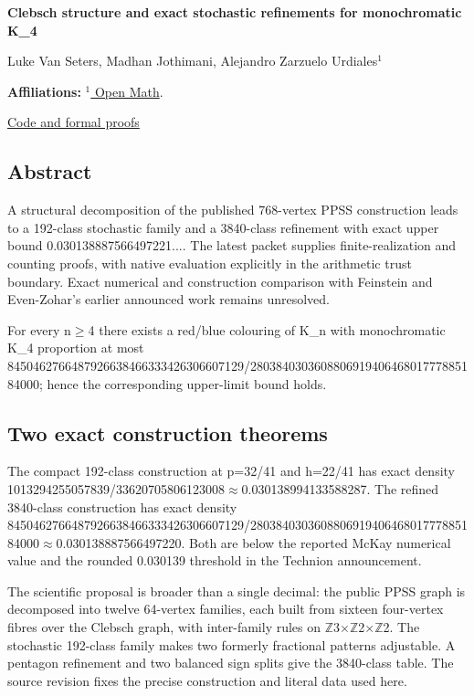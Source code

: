 \documentclass[11pt,a4paper]{article}
\begin{document}
{\LARGE\bfseries Clebsch structure and exact stochastic refinements for monochromatic K\_4\par}\medskip
{\small Luke Van Seters, Madhan Jothimani, Alejandro Zarzuelo Urdiales\ensuremath{^1}\par}\medskip
{\small\textbf{Affiliations:} \href{https://rsihouse.ai/openmath}{\ensuremath{^1} Open Math}.\par}

{\small\href{https://github.com/alejandrozu/openmath-2026-judging}{Code and formal proofs}\par}

\subsection{Abstract}
A structural decomposition of the published 768-vertex PPSS construction leads to a 192-class stochastic family and a 3840-class refinement with exact upper bound 0.030138887566497221.... The latest packet supplies finite-realization and counting proofs, with native evaluation explicitly in the arithmetic trust boundary. Exact numerical and construction comparison with Feinstein and Even-Zohar's earlier announced work remains unresolved.

For every n\ensuremath{\geq}4 there exists a red/blue colouring of K\_n with monochromatic K\_4 proportion at most 8450462766487926638466333426306607129/280384030360880691940646801777885184000; hence the corresponding upper-limit bound holds.

\subsection{Two exact construction theorems}
The compact 192-class construction at p=32/41 and h=22/41 has exact density 1013294255057839/33620705806123008\ensuremath{\approx}0.030138994133588287. The refined 3840-class construction has exact density 8450462766487926638466333426306607129/280384030360880691940646801777885184000\ensuremath{\approx}0.030138887566497220. Both are below the reported McKay numerical value and the rounded 0.030139 threshold in the Technion announcement.

The scientific proposal is broader than a single decimal: the public PPSS graph is decomposed into twelve 64-vertex families, each built from sixteen four-vertex fibres over the Clebsch graph, with inter-family rules on \ensuremath{\mathbb{Z}}3\ensuremath{\times}\ensuremath{\mathbb{Z}}2\ensuremath{\times}\ensuremath{\mathbb{Z}}2. The stochastic 192-class family makes two formerly fractional patterns adjustable. A pentagon refinement and two balanced sign splits give the 3840-class table. The source revision fixes the precise construction and literal data used here.
\end{document}
